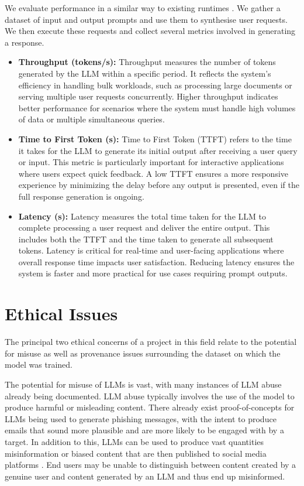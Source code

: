 \documentclass[12pt,twoside]{report}
\begin{document}
We evaluate performance in a similar way to existing runtimes \cite{kwon2023efficient}.
We gather a dataset of input and output prompts \cite{stanfordalpaca} and use them to synthesise user requests.
We then execute these requests and collect several metrics involved in generating a response.

\begin{itemize}
  \item \textbf{Throughput (tokens/s):} Throughput measures the number of tokens generated by the LLM within a specific period.
    It reflects the system’s efficiency in handling bulk workloads, such as processing large documents or serving multiple user requests concurrently. 
    Higher throughput indicates better performance for scenarios where the system must handle high volumes of data or multiple simultaneous queries.
  \item \textbf{Time to First Token (s):} Time to First Token (TTFT) refers to the time it takes for the LLM to generate its initial output after receiving a user query or input. 
    This metric is particularly important for interactive applications where users expect quick feedback. 
    A low TTFT ensures a more responsive experience by minimizing the delay before any output is presented, even if the full response generation is ongoing.
  \item \textbf{Latency (s):} Latency measures the total time taken for the LLM to complete processing a user request and deliver the entire output. 
    This includes both the TTFT and the time taken to generate all subsequent tokens. 
    Latency is critical for real-time and user-facing applications where overall response time impacts user satisfaction. 
    Reducing latency ensures the system is faster and more practical for use cases requiring prompt outputs.
\end{itemize}


\chapter{Ethical Issues} %
The principal two ethical concerns of a project in this field relate to the potential for misuse as well as provenance issues surrounding the dataset on which the model was trained.

The potential for misuse of LLMs is vast, with many instances of LLM abuse already being documented.
LLM abuse typically involves the use of the model to produce harmful or misleading content.
There already exist proof-of-concepts for LLMs \cite{hazell2023spear} being used to generate phishing messages, with the intent to produce emails that sound more plausible and are more likely to be engaged with by a target.
In addition to this, LLMs can be used to produce vast quantities misinformation or biased content that are then published to social media platforms \cite{williams2024large}. 
End users may be unable to distinguish between content created by a genuine user and content generated by an LLM and thus end up misinformed.
\end{document}

